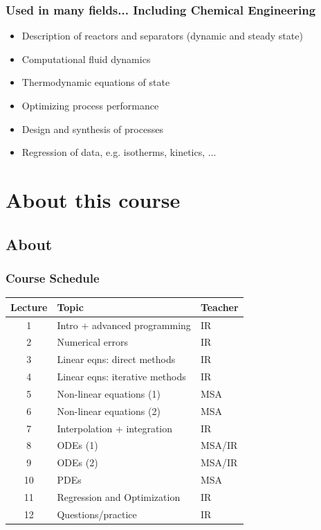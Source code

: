 \begin{frame}
 \frametitle{Used in many fields... Including Chemical Engineering}
  \begin{itemize}
	  \item Description of reactors and separators (dynamic and steady state)
		\item Computational fluid dynamics
		\item Thermodynamic equations of state
		\item Optimizing process performance
		\item Design and synthesis of processes
		\item Regression of data, e.g. isotherms, kinetics, ...
 \end{itemize}
\end{frame}

\section{About this course}
\subsection{About}
\begin{frame}
  \frametitle{Course Schedule}
  \centering
  \begin{tabular}{cll}
  \hline
  Lecture  & Topic & Teacher \\ 
  \hline
  1 & Intro + advanced programming & IR \\ 
  2 & Numerical errors & IR \\ 
  3 & Linear eqns: direct methods & IR\\ 
  4 & Linear eqns: iterative methods & IR \\ 
  5 & Non-linear equations (1) & MSA \\ 
  6 & Non-linear equations (2) & MSA\\ 
  7 & Interpolation + integration & IR \\ 
  8 & ODEs (1) & MSA/IR \\
  9 & ODEs (2) & MSA/IR \\ 
  10 & PDEs & MSA \\ 
  11 & Regression and Optimization & IR \\ 
  12 & Questions/practice & IR \\ 
  \hline
  \end{tabular} 
 \end{frame}


